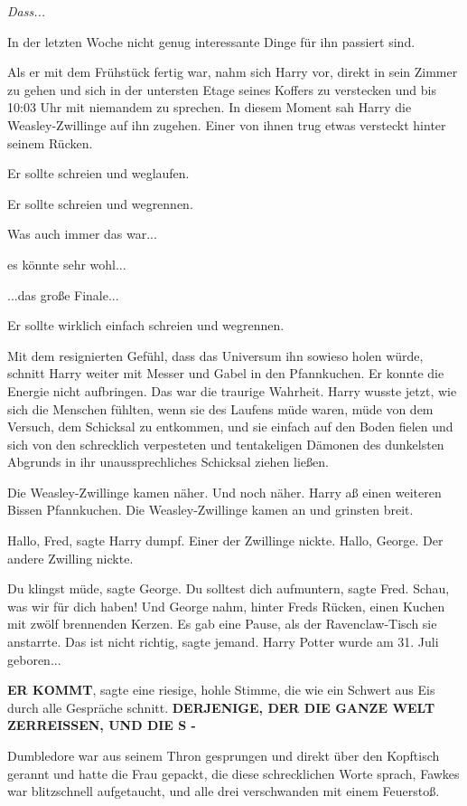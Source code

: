 \emph{Dass...}

In der letzten Woche nicht genug interessante Dinge für ihn passiert sind.

Als er mit dem Frühstück fertig war, nahm sich Harry vor, direkt in sein Zimmer
zu gehen und sich in der untersten Etage seines Koffers zu verstecken und bis
10:03 Uhr mit niemandem zu sprechen. In diesem Moment sah Harry die
Weasley-Zwillinge auf ihn zugehen. Einer von ihnen trug etwas versteckt hinter
seinem Rücken.

Er sollte schreien und weglaufen.

Er sollte schreien und wegrennen.

Was auch immer das war...

es könnte sehr wohl...

...das große Finale...

Er sollte wirklich einfach schreien und wegrennen.

Mit dem resignierten Gefühl, dass das Universum ihn sowieso holen würde, schnitt
Harry weiter mit Messer und Gabel in den Pfannkuchen. Er konnte die Energie
nicht aufbringen. Das war die traurige Wahrheit. Harry wusste jetzt, wie sich
die Menschen fühlten, wenn sie des Laufens müde waren, müde von dem Versuch, dem
Schicksal zu entkommen, und sie einfach auf den Boden fielen und sich von den
schrecklich verpesteten und tentakeligen Dämonen des dunkelsten Abgrunds in ihr
unaussprechliches Schicksal ziehen ließen.

Die Weasley-Zwillinge kamen näher. Und noch näher. Harry aß einen weiteren
Bissen Pfannkuchen. Die Weasley-Zwillinge kamen an und grinsten breit.

\glqq{}Hallo, Fred\grqq{}, sagte Harry dumpf. Einer der Zwillinge nickte. \glqq{}
Hallo, George.\grqq{} Der andere Zwilling nickte.

\glqq{}Du klingst müde\grqq{}, sagte George. \glqq{}Du solltest dich
aufmuntern\grqq{}, sagte Fred. \glqq{}Schau, was wir für dich haben!\grqq{} Und
George nahm, hinter Freds Rücken, einen Kuchen mit zwölf brennenden Kerzen. Es
gab eine Pause, als der Ravenclaw-Tisch sie anstarrte. \glqq{}Das ist nicht
richtig\grqq{}, sagte jemand. \glqq{}Harry Potter wurde am 31. Juli
geboren...\grqq{}

\textbf{\glqq{}ER KOMMT\grqq{}}, sagte eine riesige, hohle Stimme, die wie ein
Schwert aus Eis durch alle Gespräche schnitt. \textbf{\glqq{}DERJENIGE, DER DIE
GANZE WELT ZERREISSEN, UND DIE S -\grqq{}}

Dumbledore war aus seinem Thron gesprungen und direkt über den Kopftisch gerannt
und hatte die Frau gepackt, die diese schrecklichen Worte sprach, Fawkes war
blitzschnell aufgetaucht, und alle drei verschwanden mit einem Feuerstoß.

